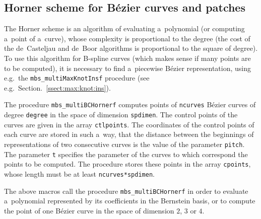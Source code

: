 \subsection{Horner scheme for B\'{e}zier curves and patches}

The Horner scheme is an algorithm of evaluating a~polynomial (or computing
a~point of a~curve), whose complexity is proportional to the degree
(the cost of the de~Casteljau and de~Boor algorithms is proportional
to the square of degree). To use this algorithm for B-spline curves
(which makes sense if many points are to be computed), it is necessary
to find a~piecewise B\'{e}zier representation, using
e.g.\ the \texttt{mbs\_multiMaxKnotInsf} procedure (see e.g.\
Section.~\ref{ssect:max:knot:ins}).

\vspace{\bigskipamount}
The procedure \texttt{mbs\_multiBCHornerf} computes points of \texttt{ncurves}
B\'{e}zier curves of degree \texttt{degree} in the space of dimension
\texttt{spdimen}. The control points of the curves are given in the array
\texttt{ctlpoints}. The coordinates of the control points of each curve
are stored in such a~way, that the distance between the beginnings of
representations of two consecutive curves is the value of the parameter
\texttt{pitch}.
The parameter \texttt{t} specifies the parameter of the curves
to which correspond the points to be computed. The procedure stores these
points in the array \texttt{cpoints}, whose length must be at least
\texttt{ncurves*spdimen}.

\vspace{\bigskipamount}
The above macros call the procedure \texttt{mbs\_multiBCHornerf} in order to
evaluate a~polynomial represented by its coefficients in the Bernstein basis,
or to compute the point of one B\'{e}zier curve in the space of dimension
$2$, $3$ or $4$.

